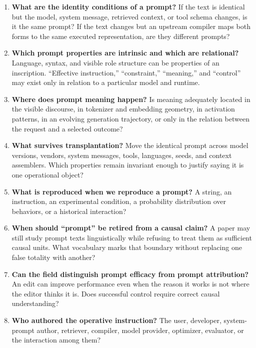 \documentclass[11pt]{article}
\begin{document}
\begin{enumerate}[leftmargin=1.6em]
\item \textbf{What are the identity conditions of a prompt?} If the text is identical but the model, system message, retrieved context, or tool schema changes, is it the same prompt? If the text changes but an upstream compiler maps both forms to the same executed representation, are they different prompts?

\item \textbf{Which prompt properties are intrinsic and which are relational?} Language, syntax, and visible role structure can be properties of an inscription. ``Effective instruction,'' ``constraint,'' ``meaning,'' and ``control'' may exist only in relation to a particular model and runtime.

\item \textbf{Where does prompt meaning happen?} Is meaning adequately located in the visible discourse, in tokenizer and embedding geometry, in activation patterns, in an evolving generation trajectory, or only in the relation between the request and a selected outcome?

\item \textbf{What survives transplantation?} Move the identical prompt across model versions, vendors, system messages, tools, languages, seeds, and context assemblers. Which properties remain invariant enough to justify saying it is one operational object?

\item \textbf{What is reproduced when we reproduce a prompt?} A string, an instruction, an experimental condition, a probability distribution over behaviors, or a historical interaction?

\item \textbf{When should ``prompt'' be retired from a causal claim?} A paper may still study prompt texts linguistically while refusing to treat them as sufficient causal units. What vocabulary marks that boundary without replacing one false totality with another?

\item \textbf{Can the field distinguish prompt efficacy from prompt attribution?} An edit can improve performance even when the reason it works is not where the editor thinks it is. Does successful control require correct causal understanding?

\item \textbf{Who authored the operative instruction?} The user, developer, system-prompt author, retriever, compiler, model provider, optimizer, evaluator, or the interaction among them?


\end{enumerate}
\end{document}
